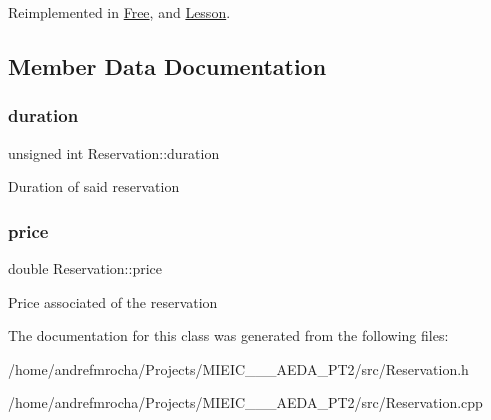 Reimplemented in \mbox{\hyperlink{class_free_a5eec9da16ebf4f388d16dd270bd93b64}{Free}}, and \mbox{\hyperlink{class_lesson_a645855060ab3c915a6e0875bc5584887}{Lesson}}.



\subsection{Member Data Documentation}
\mbox{\label{class_reservation_a1a311bb23edebfa226f9c744aefdc7b1}} 
\subsubsection{\texorpdfstring{duration}{duration}}
{\footnotesize\ttfamily unsigned int Reservation\+::duration\hspace{0.3cm}{\ttfamily [protected]}}

Duration of said reservation \mbox{\label{class_reservation_a82e197bd30e7949ee9b8616ee4eacf83}} 
\subsubsection{\texorpdfstring{price}{price}}
{\footnotesize\ttfamily double Reservation\+::price\hspace{0.3cm}{\ttfamily [protected]}}

Price associated of the reservation 

The documentation for this class was generated from the following files\+:\begin{DoxyCompactItemize}
\item 
/home/andrefmrocha/\+Projects/\+M\+I\+E\+I\+C\+\_\+\_\+\_\+\+A\+E\+D\+A\+\_\+\+P\+T2/src/Reservation.\+h\item 
/home/andrefmrocha/\+Projects/\+M\+I\+E\+I\+C\+\_\+\_\+\_\+\+A\+E\+D\+A\+\_\+\+P\+T2/src/Reservation.\+cpp\end{DoxyCompactItemize}
